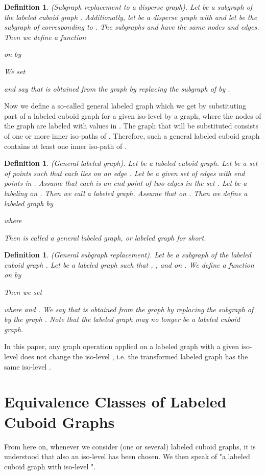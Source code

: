 \documentclass[a4paper,11pt]{article}
\newtheorem{definition}[theorem]{Definition}
\begin{document}
\begin{definition}(Subgraph replacement to a disperse graph). Let  be a subgraph
of the labeled cuboid graph . Additionally, let  be a disperse graph
with  and let  be the subgraph of 
corresponding to . The subgraphs  and  have the same nodes and edges. Then we define a function

on  by

We set

and say that  is obtained from the graph  by replacing
the subgraph  of  by .
\label{def:labeled-graph-3-2}
\end{definition}

Now we define a so-called general labeled graph  which we get by substituting
part of a labeled cuboid graph  for a given iso-level  by a graph, where the
nodes of the graph are labeled with values in . The graph that will be substituted consists of
one or more inner iso-paths of . Therefore, such a general labeled cuboid graph contains at least one
inner iso-path of .
\begin{definition}(General labeled graph). Let  be a labeled cuboid graph.
Let  be a set of  points such that each  lies on
an edge . Let  be a given set of edges with end points in . Assume that each
 is an end point of two edges in the set .
Let  be a labeling on .
Then we call  a labeled graph.
Assume that  on . Then we define a labeled graph
 by

where

Then  is called a general labeled graph, or labeled graph for short.
\label{def:labeled-graph-4a}
\end{definition}

\begin{definition}(General subgraph replacement). Let  be a subgraph of the labeled
cuboid graph . Let  be a labeled graph
such that , ,  and  
on . We define a function  on  by

Then we set

where  and .
We say that  is obtained from the graph  by replacing
the subgraph  of  by the graph
. Note that the labeled graph 
may no longer be a labeled cuboid graph.
\label{def:labeled-graph-4}
\end{definition}

In this paper, any graph operation applied on a labeled graph with a given iso-level 
does not change the iso-level , i.e. the transformed labeled graph has the same iso-level
.

\section{Equivalence Classes of Labeled Cuboid Graphs}
From here on, whenever we consider (one or several) labeled cuboid graphs, it is understood that also
an iso-level  has been chosen. We then speak of "a labeled cuboid graph  with
iso-level ".
\end{document}
